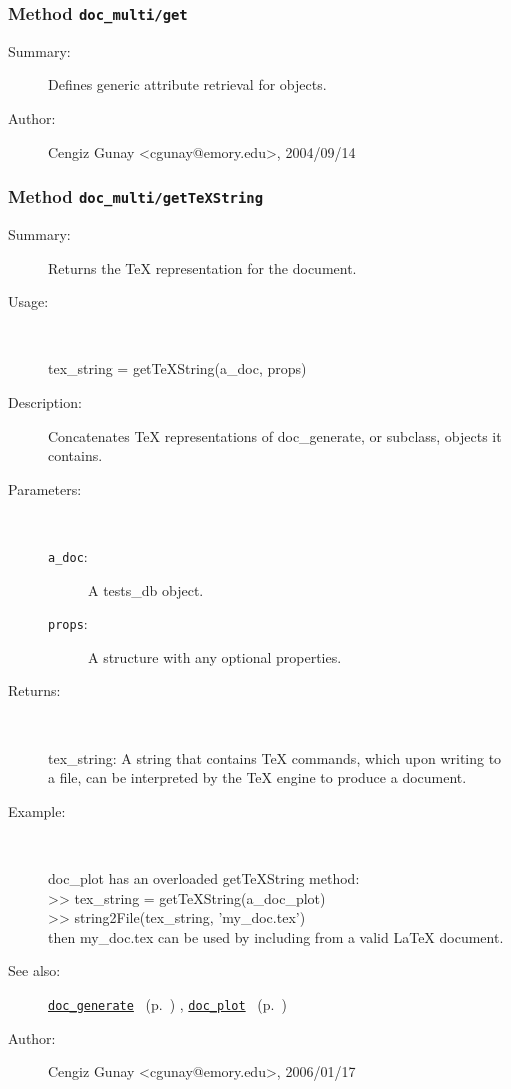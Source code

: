 \subsubsection[Method \texttt{get}]{Method \texttt{doc\_multi/get}}%
%
\label{ref_doc_multi__get}%
\hypertarget{ref_doc_multi__get}{}%
\begin{description}
\item[Summary:]Defines generic attribute retrieval for objects.
%
%
%
%
%
%
%
\item[Author:]%
Cengiz Gunay <cgunay@emory.edu>, 2004/09/14
%
\end{description}
\methodline%
\subsubsection[Method \texttt{getTeXString}]{Method \texttt{doc\_multi/getTeXString}}%
%
\label{ref_doc_multi__getTeXString}%
\hypertarget{ref_doc_multi__getTeXString}{}%
\begin{description}
\item[Summary:]Returns the TeX representation for the document.
%
\item[Usage:]~%
\begin{lyxcode}%
tex\_string = getTeXString(a\_doc, props)
%
\end{lyxcode}%
%
\item[Description:]%
Concatenates TeX representations of doc\_generate, or subclass, objects it contains.
\item[Parameters:]~
\begin{description}%
\item[\texttt{a\_doc}:]
 A tests\_db object.
\item[\texttt{props}:]
 A structure with any optional properties.
\end{description}%
%
\item[Returns:
]~

	tex\_string: A string that contains TeX commands, which upon writing to a file,
	  can be interpreted by the TeX engine to produce a document.
%
\item[Example:]~
\begin{lyxcode}        doc\_plot has an overloaded getTeXString method:
\\%
        >> tex\_string = getTeXString(a\_doc\_plot)
\\%
        >> string2File(tex\_string, 'my\_doc.tex')
\\%
        then my\_doc.tex can be used by including from a valid LaTeX document.
\\%
\end{lyxcode}
%
\item[See also:]%
\hyperlink{ref_doc_generate}{\texttt{doc\_generate}}%
\ (p.~\pageref{ref_doc_generate})%
%
, \hyperlink{ref_doc_plot}{\texttt{doc\_plot}}%
\ (p.~\pageref{ref_doc_plot})%
%
%
\item[Author:]%
Cengiz Gunay <cgunay@emory.edu>, 2006/01/17
%
\end{description}
\methodline%
